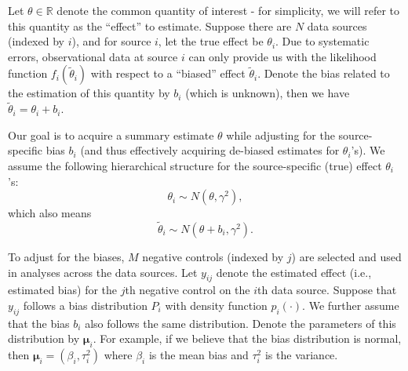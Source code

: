 \documentclass{article}
\begin{document}
Let $\theta \in \mathbb{R}$ denote the common quantity of interest - for simplicity, we will refer to this quantity as the ``effect'' to estimate. 
Suppose there are $N$ data sources (indexed by $i$), and for source $i$, let the true effect be $\theta_i$. 
Due to systematic errors, observational data at source $i$ can only provide us with the likelihood function $f_i(\tilde{\theta}_i)$ 
with respect to a ``biased'' effect $\tilde{\theta}_i$.
Denote the bias related to the estimation of this quantity by $b_i$ (which is unknown), then we have $\tilde{\theta}_i = \theta_i + b_i$.

Our goal is to acquire a summary estimate $\theta$ 
while adjusting for the source-specific bias $b_i$ (and thus effectively acquiring de-biased estimates for $\theta_i$'s).
We assume the following hierarchical structure for the source-specific (true) effect $\theta_i$'s:
\begin{equation}
\label{eq: theta_i-dist}
    \theta_i \sim N(\theta, \gamma^2),
\end{equation}
which also means
\begin{equation}
    \tilde\theta_i \sim N(\theta+b_i, \gamma^2).
\end{equation}



To adjust for the biases, $M$ negative controls (indexed by $j$) are selected and used in analyses across the data sources.
Let $y_{ij}$ denote the estimated effect (i.e., estimated bias) for the $j$th negative control on the $i$th data source. Suppose that $y_{ij}$ follows a bias distribution $P_i$ with density function $p_i(\cdot)$. 
We further assume that the bias $b_i$ also follows the same distribution. 
Denote the parameters of this distribution by $\boldsymbol\mu_i$. 
For example, if we believe that the bias distribution is normal, 
then $\boldsymbol\mu_i = (\beta_i, \tau_i^2)$ where $\beta_i$ is the mean bias and $\tau_i^2$ is the variance. 
\end{document}
